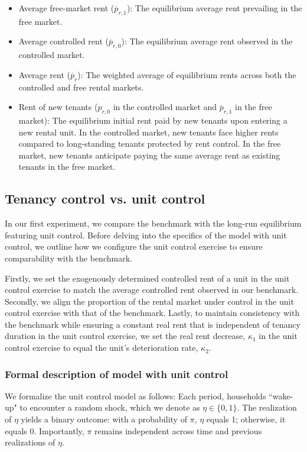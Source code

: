 \documentclass[parskip=full]{article}
\begin{document}
\begin{itemize}
    \item Average free-market rent ($\overline{p}_{r,1}$): The equilibrium average rent prevailing in the free market.
    \item Average controlled rent ($\overline{p}_{r,0}$): The equilibrium average rent observed in the controlled market.
    \item Average rent ($\overline{p}_{r}$): The weighted average of equilibrium rents across both the controlled and free rental markets.
    \item Rent of new tenants ($p_{r,0}$ in the controlled market and $\overline{p}_{r,1}$ in the free market): The equilibrium initial rent paid by new tenants upon entering a new rental unit. In the controlled market, new tenants face higher rents compared to long-standing tenants protected by rent control. In the free market, new tenants anticipate paying the same average rent as existing tenants in the free market.
\end{itemize}

\subsection{Tenancy control vs. unit control}

In our first experiment, we compare the benchmark with the long-run equilibrium featuring unit control. Before delving into the specifics of the model with unit control, we outline how we configure the unit control exercise to ensure comparability with the benchmark.

Firstly, we set the exogenously determined controlled rent of a unit in the unit control exercise to match the average controlled rent observed in our benchmark. Secondly, we align the proportion of the rental market under control in the unit control exercise with that of the benchmark. Lastly, to maintain consistency with the benchmark while ensuring a constant real rent that is independent of tenancy duration in the unit control exercise, we set the real rent decrease, $\kappa_{1}$ in the unit control exercise to equal the unit's deterioration rate, $\kappa_{2}$.

\subsubsection{Formal description of model with unit control}

We formalize the unit control model as follows: Each period, households ``wake-up" to encounter a random shock, which we denote as $\eta \in \{0,1\}$. The realization of $\eta$ yields a binary outcome: with a probability of $\pi$, $\eta$ equals 1; otherwise, it equals 0. Importantly, $\pi$ remains independent across time and previous realizations of $\eta$.
\end{document}
